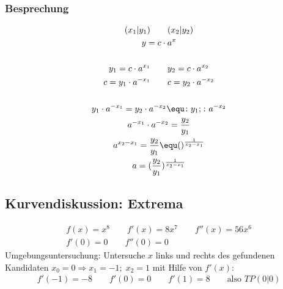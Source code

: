 \subsubsection*{Besprechung}
\begin{gather*}
  (x_1|y_1) \qquad (x_2|y_2) \\
  y = c \cdot a^x \\\\
  y_1 = c \cdot a^{x_1} \qquad y_2 = c \cdot a^{x_2} \\
  c = y_1 \cdot a^{-x_1} \qquad c = y_2 \cdot a^{-x_2} \\\\
  y_1 \cdot a^{-x_1} = y_2 \cdot a^{-x_2} \equ \colon y_1; \colon a^{-x_2} \\
  a^{-x_1} \cdot a^{-x_2} = \frac{y_2}{y_1} \\
  a^{x_2 - x_1} = \frac{y_2}{y_1} \equ ()^\frac{1}{x_2 - x_1} \\
  a = (\frac{y_2}{y_1})^\frac{1}{x_2 - x_1}
\end{gather*}
\subsection*{Kurvendiskussion: Extrema}
\begin{gather*}
  f(x) = x^8 \qquad f'(x) = 8x^7 \qquad f''(x) = 56x^6 \\
  f'(0) = 0 \qquad f''(0) = 0
\end{gather*}
Umgebungsuntersuchung: Untersuche $x$ links und rechts des gefundenen Kandidaten $x_0 = 0 \Rightarrow x_1 = -1;\; x_2 = 1$ mit Hilfe von $f'(x)$:
\begin{gather*}
  f'(-1) = -8 \qquad f'(0) = 0 \qquad f'(1) = 8 \qquad \text{also } TP(0|0)
\end{gather*}
